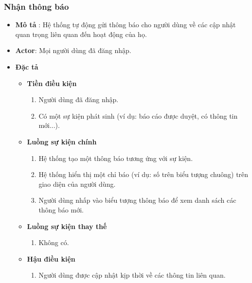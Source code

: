 \documentclass[../DoAn.tex]{subfiles}
\begin{document}
\subsubsection{Nhận thông báo}
\begin{itemize}
	\item \textbf{Mô tả} : Hệ thống tự động gửi thông báo cho người dùng về các cập nhật quan trọng liên quan đến hoạt động của họ.
	\item \textbf{Actor}: Mọi người dùng đã đăng nhập.
	\item \textbf{Đặc tả}
	      \begin{itemize}
		      \item \textbf{Tiền điều kiện}
		            \begin{enumerate}
			            \item Người dùng đã đăng nhập.
			            \item Có một sự kiện phát sinh (ví dụ: báo cáo được duyệt, có thông tin mới...).
		            \end{enumerate}
		      \item \textbf{Luồng sự kiện chính}
		            \begin{enumerate}
			            \item Hệ thống tạo một thông báo tương ứng với sự kiện.
			            \item Hệ thống hiển thị một chỉ báo (ví dụ: số trên biểu tượng chuông) trên giao diện của người dùng.
			            \item Người dùng nhấp vào biểu tượng thông báo để xem danh sách các thông báo mới.
		            \end{enumerate}
		      \item \textbf{Luồng sự kiện thay thế}
		            \begin{enumerate}
			            \item Không có.
		            \end{enumerate}
		      \item \textbf{Hậu điều kiện}
		            \begin{enumerate}
			            \item Người dùng được cập nhật kịp thời về các thông tin liên quan.
		            \end{enumerate}
	      \end{itemize}
\end{itemize}
\end{document}
